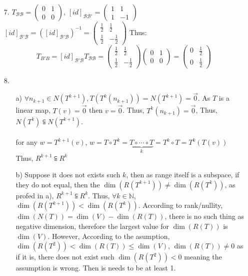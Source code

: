 \documentclass{article}
\begin{document}
\begin{itemize}
    \item [7.]
    \(T_{\mathcal{BB}} = \begin{pmatrix}
        0&1\\0&0
    \end{pmatrix}\), \([id]_{\mathcal{BB'}} = \begin{pmatrix}
        1&1\\1&-1
    \end{pmatrix}\)
    \([id]_{\mathcal{B'B}}  = \left([id]_{\mathcal{B'B}}\right)^{-1}= \begin{pmatrix}
        \frac{1}{2}&\frac{1}{2}\\\frac{1}{2}&-\frac{1}{2}
    \end{pmatrix}\) Thus: \[T_{B'B} = [id]_{\mathcal{B'B}}T_{\mathcal{BB}} = \begin{pmatrix}
        \frac{1}{2}&\frac{1}{2}\\\frac{1}{2}&-\frac{1}{2}
    \end{pmatrix}\begin{pmatrix}
        0&1\\0&0
    \end{pmatrix} = \begin{pmatrix}
        0&\frac{1}{2}\\0&\frac{1}{2}
    \end{pmatrix}\]
    \item [8.]
    \begin{itemize}
        \item [a)] \(\forall n_{k+1}\in N(T^{k+1}), T(T^k(n_{k+1})) = N(T^{k+1}) = \overrightarrow{0}\). As \(T\) is a linear map, \(T(v) = \overrightarrow{0}\) then \(v = \overrightarrow{0}\). Thus, \(T^k(n_{k+1})= \overrightarrow{0}\), Thus, \(N(T^k)\subseteqq N(T^{k+1})\).\\
        \\ 
        for any \(w = T^{k+1}(v)\), \(w = T\circ T^k = \underbrace{T\circ\cdots\circ T}_{k} = T^k \circ T = T^k(T(v))\)
        Thus, \(R^{k+1}\subseteqq R^k\)
        \item [b)]Suppose it does not exists such \(k\), then as range itself is a subspace, if they do not equal, then the \(\dim(R(T^{k+1}))\neq\dim(R(T^{k}))\), as profed in a), \(R^{k+1}\subseteqq R^k\). Thus, \(\forall k\in\mathbb{N}\), 
        \(\dim(R(T^{k+1}))<\dim(R(T^{k}))\). According to rank/nullity, \(\dim(N(T)) = \dim(V)-\dim(R(T))\), there is no such thing as negative dimension, therefore the largest value for \(\dim(R(T))\) is \(\dim(V)\). However, According to the asumption,
        \(\dim(R(T^{2}))<\dim(R(T))\leq \dim(V)\), \(\dim(R(T))\neq 0 \) as if it is, there does not exist such \(\dim(R(T^2))<0\) meaning the assumption is wrong. Then is needs to be at least 1.

\end{itemize}
\end{itemize}
\end{document}

